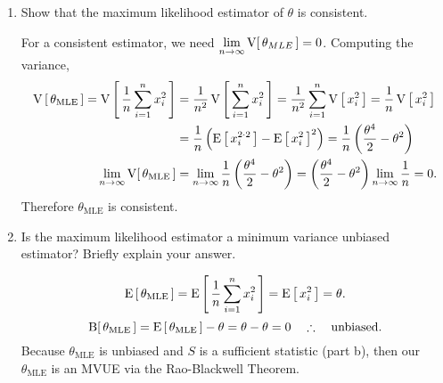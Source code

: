 \begin{enumerate}[label=(\alph*)]
\begin{mybox}
    \end{mybox}
    \item Show that the maximum likelihood estimator of $\theta$ is consistent.
    \begin{mybox}
        For a consistent estimator, we need $\displaystyle \lim_{n\to\infty} \operatorname{V} [\,{\theta_{MLE}}\, ] = 0$. Computing the variance,
        \begin{align*}
            \operatorname{V} \left[ { \,{\theta_{\text{MLE}}}\, } \right] = \operatorname{V} \left[ { \,{\frac{1}{{n}}\sum_{i=1}^n x_i^2}\, } \right] &= \frac{1}{{n^2}}\operatorname{V} \left[ { \,{\sum_{i=1}^n x_i^2}\, } \right] = \frac{1}{{n^2}}\sum_{i=1}^n \operatorname{V} \left[ { \,{x_i^2}\, } \right] = \frac{1}{{n}} \operatorname{V} \left[ { \,{x_i^2}\, } \right]\\
            &= \frac{1}{{n}} \left( {\operatorname{E} \left[ { \,{x_i^{2\cdot 2}}\, } \right] - \operatorname{E} \left[ { \,{x_i^2}\, } \right]^2} \right) = \frac{1}{{n}} \left( {\frac{\theta^4}{2} - \theta^2} \right)\\
            \lim_{n\to\infty} \operatorname{V} [\,{\theta_{\text{MLE}}}\, ] &= \lim_{n\to\infty} \frac{1}{{n}}\left( {\dfrac{\theta^4}{2} - \theta^2} \right) = \left( {\dfrac{\theta^4}{2} - \theta^2} \right) \lim_{n\to\infty} \frac{1}{{n}} = 0.
        \end{align*}
        Therefore $\theta_{\text{MLE}}$ is consistent.
    \end{mybox}
\vspace{.5in}
    \item Is the maximum likelihood estimator a minimum variance unbiased estimator? Briefly explain your answer.
    \begin{mybox}
        $$\operatorname{E} \left[ { \,{\theta_{\text{MLE}}}\, } \right] = \operatorname{E} \left[ { \,{\frac{1}{{n}}\sum_{i=1}^n x_i^2}\, } \right] = \operatorname{E} \left[ { \,{x_i^2}\, } \right] = \theta.$$
        $$\operatorname{B}[\,\theta_{\text{MLE}}\,] = \operatorname{E} \left[ { \,{\theta_{\text{MLE}}}\, } \right] - \theta = \theta - \theta = 0 \quad \therefore \quad \text{unbiased.}$$
        Because $\theta_{\text{MLE}}$ is unbiased and $S$ is a sufficient statistic (part b), then our $\theta_{\text{MLE}}$ is an MVUE via the Rao-Blackwell Theorem. 
    \end{mybox}

    \end{enumerate} 